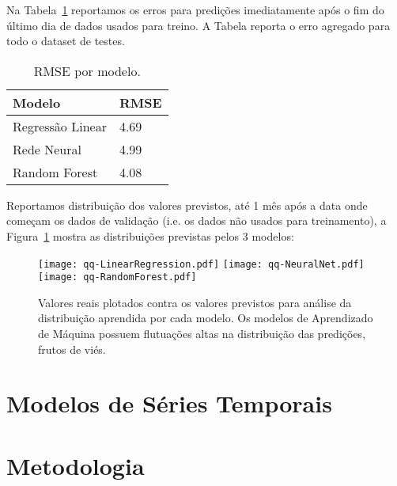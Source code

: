 Na Tabela~\ref{tb:rmse_lin} reportamos os erros para predições imediatamente
após o fim do último dia de dados usados para treino. A Tabela reporta o erro agregado
para todo o dataset de testes.

\begin{center}
\begin{table}[htbp]
\caption{RMSE por modelo.}
\centering
\begin{tabular}{|l|l|}
    \hline
    Modelo           & RMSE \\ \hline
    Regressão Linear & 4.69 \\ \hline
    Rede Neural      & 4.99 \\ \hline
    Random Forest    & 4.08 \\ \hline
  \end{tabular}
\label{tb:rmse_lin}
\end{table}
\end{center}

 Reportamos distribuição dos valores previstos, até 1 mês após a data
onde começam os dados de validação (i.e. os dados não usados para treinamento),
a Figura~\ref{fig:distr_lin} mostra as distribuições previstas pelos 3 modelos:

\begin{figure}[H]
\centering
\texttt{[image: qq-LinearRegression.pdf]} \hfill
\texttt{[image: qq-NeuralNet.pdf]} \hfill
\texttt{[image: qq-RandomForest.pdf]} 
\caption{Valores reais plotados contra os valores previstos para análise da
  distribuição aprendida por cada modelo. Os modelos de Aprendizado de Máquina
  possuem flutuações altas na distribuição das predições, frutos de viés.} 
\label{fig:distr_lin}
\end{figure}


\section{Modelos de Séries Temporais}

\section{Metodologia}

